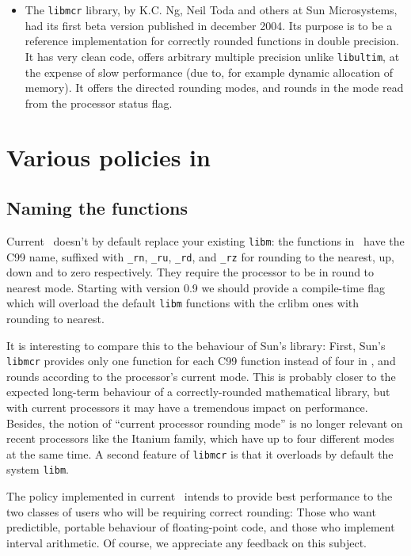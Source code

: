 \begin{itemize}
\item The \texttt{libmcr} library, by K.C. Ng, Neil Toda and others at
  Sun Microsystems, had its first beta version published in december
  2004. Its purpose is to be a reference implementation for correctly
  rounded functions in double precision. It has very clean code,
  offers arbitrary multiple precision unlike \texttt{libultim}, at the
  expense of slow performance (due to, for example dynamic allocation
  of memory). It offers the directed rounding modes, and rounds in the
  mode read from the processor status flag.
\end{itemize}


\section{Various policies in \crlibm}

\subsection{Naming the functions}
Current \crlibm\ doesn't by default replace your existing \texttt{libm}: the
functions in \crlibm\ have the C99 name, suffixed with \texttt{\_rn},
\texttt{\_ru}, \texttt{\_rd}, and \texttt{\_rz} for rounding to the
nearest, up, down and to zero respectively. They require the processor
to be in round to nearest mode. Starting with version 0.9 we should
provide a compile-time flag which will overload the default
\texttt{libm} functions with the crlibm ones with rounding to nearest.

It is interesting to compare this to the behaviour of Sun's library:
First, Sun's \texttt{libmcr} provides only one function for each C99
function instead of four in \crlibm, and rounds according to the
processor's current mode. This is probably closer to the expected
long-term behaviour of a correctly-rounded mathematical library, but
with current processors it may have a tremendous impact on
performance. Besides, the notion of ``current processor rounding
mode'' is no longer relevant on recent processors like the Itanium
family, which have up to four different modes at the same time.  A
second feature of \texttt{libmcr} is that it overloads by default the
system \texttt{libm}.

The policy implemented in current \crlibm\ intends to provide best
performance to the two classes of users who will be requiring correct
rounding: Those who want predictible, portable behaviour of
floating-point code, and those who implement interval arithmetic. Of course, we
appreciate any feedback on this subject.

